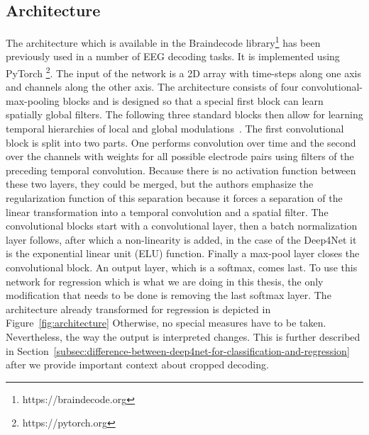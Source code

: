 \subsection{Architecture}\label{subsec:architecture}
The architecture which is available in the Braindecode library\footnote{https://braindecode.org} has been previously used in a number of EEG decoding tasks\cite{Hammer-2021, schirrmeister-deep-2017, hartmann-hierarchical-2018}.
It is implemented using PyTorch \footnote{https://pytorch.org}.
The input of the network is a 2D array with time-steps along one axis and channels along the other axis.
The architecture consists of four convolutional-max-pooling blocks and is designed so that a special first block can learn spatially global filters.
The following three standard blocks then allow for learning temporal hierarchies of local and global modulations~\cite{schirrmeister-deep-2017}.
The first convolutional block is split into two parts.
One performs convolution over time and the second over the channels with weights for all possible electrode pairs using filters of the preceding temporal convolution.
Because there is no activation function between these two layers, they could be merged, but the authors emphasize the regularization function of this separation because it forces a separation of the linear transformation into a temporal convolution and a spatial filter.
The convolutional blocks start with a convolutional layer, then a batch normalization layer follows, after which a non-linearity is added, in the case of the Deep4Net it is the exponential linear unit (ELU) function\cite{clevert-elu-2016}.
Finally a max-pool layer closes the convolutional block.
An output layer, which is a softmax, comes last.
To use this network for regression which is what we are doing in this thesis, the only modification that needs to be done is removing the last softmax layer.
The architecture already transformed for regression is depicted in Figure~\ref{fig:architecture}
Otherwise, no special measures have to be taken.
Nevertheless, the way the output is interpreted changes.
This is further described in Section~\ref{subsec:difference-between-deep4net-for-classification-and-regression} after we provide important context about cropped decoding.


